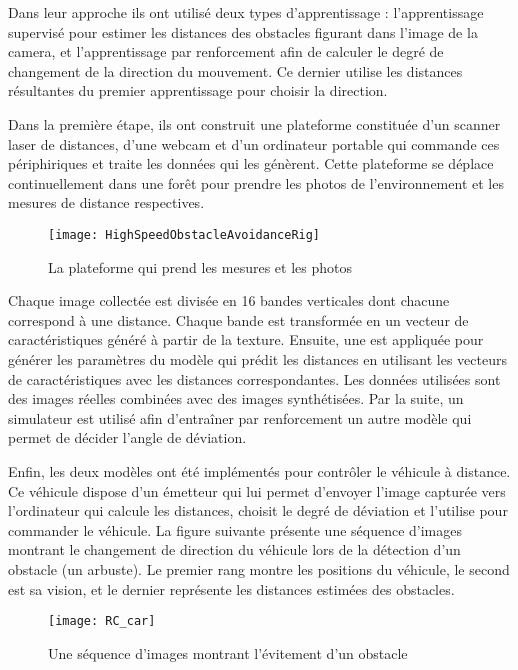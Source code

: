 Dans leur approche ils ont utilisé deux types d'apprentissage : l'apprentissage
supervisé pour estimer les distances des obstacles figurant dans l'image de la
camera, et l'apprentissage par renforcement afin de calculer le degré de
changement de la direction du mouvement. Ce dernier utilise les distances résultantes
du premier apprentissage pour choisir la direction.

Dans la première étape, ils ont construit une plateforme constituée d'un
scanner laser de distances, d'une webcam et d'un ordinateur portable qui commande
ces périphiriques et traite les données qui les génèrent. Cette plateforme se
déplace continuellement dans une forêt pour prendre les photos de
l'environnement et les mesures de distance respectives.

\begin{figure}[H]
\begin{center}
\texttt{[image: HighSpeedObstacleAvoidanceRig]}
\caption{La plateforme qui prend les mesures et les photos}
\end{center}
\end{figure}

Chaque image collectée est divisée en 16 bandes verticales dont chacune correspond
à une distance. Chaque bande est transformée en un vecteur de caractéristiques
généré à partir de la texture. Ensuite, une  est
appliquée pour générer les paramètres du modèle qui prédit les distances en
utilisant les vecteurs de caractéristiques avec les distances correspondantes.
Les données utilisées sont des images réelles combinées avec des images synthétisées.
Par la suite, un simulateur est utilisé afin d'entraîner par renforcement un
autre modèle qui permet de décider l'angle de déviation.

Enfin, les deux modèles ont été implémentés pour contrôler le véhicule à
distance. Ce véhicule dispose d'un émetteur qui lui permet d'envoyer l'image
capturée vers l'ordinateur qui calcule les distances, choisit le degré de
déviation et l'utilise pour commander le véhicule. La figure suivante présente
une séquence d'images montrant le changement de direction du véhicule lors de
la détection d'un obstacle (un arbuste). Le premier rang montre les positions
du véhicule, le second est sa vision, et le dernier représente les distances
estimées des obstacles.

\begin{figure}[H]
\texttt{[image: RC\_car]}
\caption{Une séquence d'images montrant l'évitement d'un obstacle}
\end{figure}

